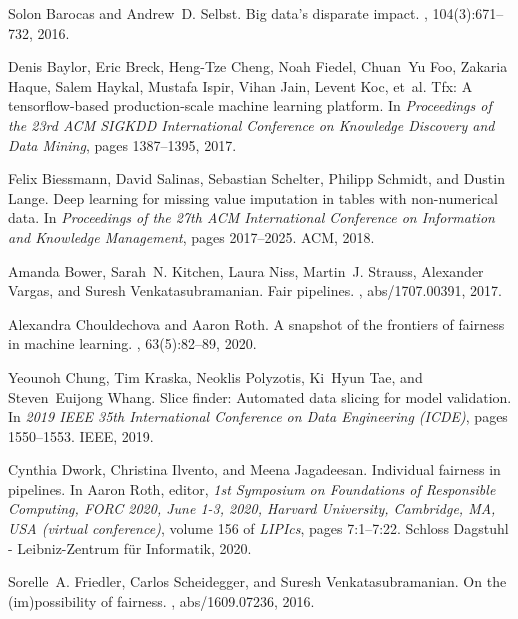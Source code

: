 \documentclass[11pt]{article}
\begin{document}
\begin{thebibliography}{10}
  
Solon Barocas and Andrew~D. Selbst.
\newblock Big data's disparate impact.
, 104(3):671--732, 2016.

Denis Baylor, Eric Breck, Heng-Tze Cheng, Noah Fiedel, Chuan~Yu Foo, Zakaria
  Haque, Salem Haykal, Mustafa Ispir, Vihan Jain, Levent Koc, et~al.
\newblock Tfx: A tensorflow-based production-scale machine learning platform.
\newblock In {\em Proceedings of the 23rd ACM SIGKDD International Conference
  on Knowledge Discovery and Data Mining}, pages 1387--1395, 2017.

Felix Biessmann, David Salinas, Sebastian Schelter, Philipp Schmidt, and Dustin
  Lange.
\newblock Deep learning for missing value imputation in tables with
  non-numerical data.
\newblock In {\em Proceedings of the 27th ACM International Conference on
  Information and Knowledge Management}, pages 2017--2025. ACM, 2018.

Amanda Bower, Sarah~N. Kitchen, Laura Niss, Martin~J. Strauss, Alexander
  Vargas, and Suresh Venkatasubramanian.
\newblock Fair pipelines.
, abs/1707.00391, 2017.

Alexandra Chouldechova and Aaron Roth.
\newblock A snapshot of the frontiers of fairness in machine learning.
, 63(5):82--89, 2020.

Yeounoh Chung, Tim Kraska, Neoklis Polyzotis, Ki~Hyun Tae, and Steven~Euijong
  Whang.
\newblock Slice finder: Automated data slicing for model validation.
\newblock In {\em 2019 IEEE 35th International Conference on Data Engineering
  (ICDE)}, pages 1550--1553. IEEE, 2019.


Cynthia Dwork, Christina Ilvento, and Meena Jagadeesan.
\newblock Individual fairness in pipelines.
\newblock In Aaron Roth, editor, {\em 1st Symposium on Foundations of
  Responsible Computing, {FORC} 2020, June 1-3, 2020, Harvard University,
  Cambridge, MA, {USA} (virtual conference)}, volume 156 of {\em LIPIcs}, pages
  7:1--7:22. Schloss Dagstuhl - Leibniz-Zentrum f{\"{u}}r Informatik, 2020.

Sorelle~A. Friedler, Carlos Scheidegger, and Suresh Venkatasubramanian.
\newblock On the (im)possibility of fairness.
, abs/1609.07236, 2016.


\end{thebibliography}
\end{document}
